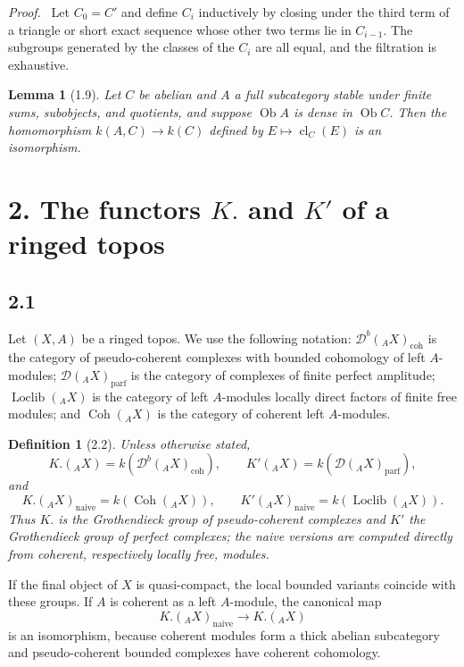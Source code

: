 \documentclass[11pt]{article}
\theoremstyle{plain}
\newtheorem*{lemma*}{Lemma}
\newtheorem*{definition*}{Definition}
\theoremstyle{definition}
\theoremstyle{remark}
\newenvironment{prooftext}{\par\noindent\textit{Proof.}\ }{\par\medskip}
\newcommand{\D}{\mathcal D}\newcommand{\E}{\mathcal E}\newcommand{\F}{\mathcal F}
\DeclareMathOperator{\ob}{Ob}
\DeclareMathOperator{\cl}{cl}
\providecommand{\Coh}{\operatorname{Coh}}
\providecommand{\Loclib}{\operatorname{Loclib}}
\begin{document}
\begin{prooftext}
Let $C_0=C'$ and define $C_i$ inductively by closing under the third term of a triangle or short exact sequence whose other two terms lie in $C_{i-1}$. The subgroups generated by the classes of the $C_i$ are all equal, and the filtration is exhaustive.
\end{prooftext}

\begin{lemma*}[1.9]
Let $C$ be abelian and $A$ a full subcategory stable under finite sums, subobjects, and quotients, and suppose $\ob A$ is dense in $\ob C$. Then the homomorphism $k(A,C)\to k(C)$ defined by $E\mapsto\cl_C(E)$ is an isomorphism.
\end{lemma*}

\section*{2. The functors $K.$ and $K'$ of a ringed topos}

\subsection*{2.1}
Let $(X,A)$ be a ringed topos. We use the following notation: $\D^b({}_AX)_{\mathrm{coh}}$ is the category of pseudo-coherent complexes with bounded cohomology of left $A$-modules; $\D({}_AX)_{\mathrm{parf}}$ is the category of complexes of finite perfect amplitude; $\Loclib({}_AX)$ is the category of left $A$-modules locally direct factors of finite free modules; and $\Coh({}_AX)$ is the category of coherent left $A$-modules.

\begin{definition*}[2.2]
Unless otherwise stated,
\[
K.({}_AX)=k(\D^b({}_AX)_{\mathrm{coh}}),\qquad
K'({}_AX)=k(\D({}_AX)_{\mathrm{parf}}),
\]
and
\[
K.({}_AX)_{\mathrm{naive}}=k(\Coh({}_AX)),\qquad
K'({}_AX)_{\mathrm{naive}}=k(\Loclib({}_AX)).
\]
Thus $K.$ is the Grothendieck group of pseudo-coherent complexes and $K'$ the Grothendieck group of perfect complexes; the naive versions are computed directly from coherent, respectively locally free, modules.
\end{definition*}

If the final object of $X$ is quasi-compact, the local bounded variants coincide with these groups. If $A$ is coherent as a left $A$-module, the canonical map
\[
K.({}_AX)_{\mathrm{naive}}\longrightarrow K.({}_AX)
\]
is an isomorphism, because coherent modules form a thick abelian subcategory and pseudo-coherent bounded complexes have coherent cohomology.
\end{document}
